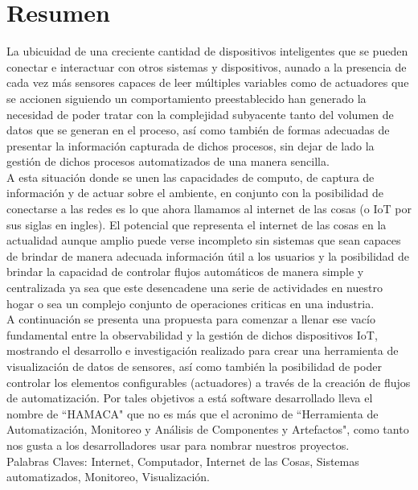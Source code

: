 \chapter*{Resumen}
La ubicuidad de una creciente cantidad de dispositivos inteligentes que se pueden conectar e interactuar con otros sistemas y dispositivos, aunado a la presencia de cada vez más sensores capaces de leer múltiples variables como de actuadores que se accionen siguiendo un comportamiento preestablecido han generado la necesidad de poder tratar con la complejidad subyacente tanto del volumen de datos que se generan en el proceso, así como también de formas adecuadas de presentar la información capturada de dichos procesos, sin dejar de lado la gestión de dichos procesos automatizados de una manera sencilla.\\

A esta situación donde se unen las capacidades de computo, de captura de información y de actuar sobre el ambiente, en conjunto con la posibilidad de conectarse a las redes es lo que ahora llamamos al internet de las cosas (o IoT por sus siglas en ingles). El potencial que representa el internet de las cosas en la actualidad aunque amplio puede verse incompleto sin sistemas que sean capaces de brindar de manera adecuada información útil a los usuarios y la posibilidad de brindar la capacidad de controlar flujos automáticos de manera simple y centralizada ya sea que este desencadene una serie de actividades en nuestro hogar o sea un complejo conjunto de operaciones criticas en una industria.\\ 

A continuación se presenta una propuesta para comenzar a llenar ese vacío fundamental entre la observabilidad y la gestión de dichos dispositivos IoT, mostrando el desarrollo e investigación realizado para crear una herramienta de visualización de datos de sensores, así como también la posibilidad de poder controlar los elementos configurables (actuadores) a través de la creación de flujos de automatización. Por tales objetivos a está software desarrollado lleva el nombre de ``HAMACA" que no es más que el acronimo de ``Herramienta de Automatización, Monitoreo y Análisis de Componentes y Artefactos", como tanto nos gusta a los desarrolladores usar para nombrar nuestros proyectos.\\
 
\vspace{\fill}
Palabras Claves: Internet, Computador, Internet de las Cosas, Sistemas automatizados, Monitoreo, Visualización.
\vspace{10px}